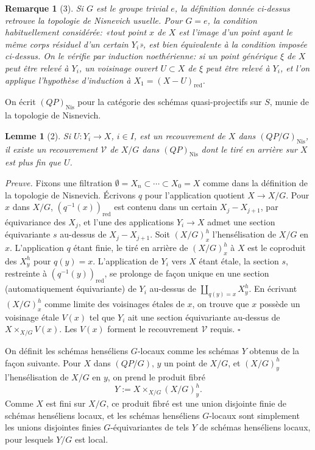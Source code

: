 \documentclass[11pt]{article}
\newcommand{\Nis}{\mathrm{Nis}}
\newcommand{\red}{\mathrm{red}}
\theoremstyle{deligne}
\newtheorem*{lemma*}{Lemme}
\newtheorem*{remark*}{Remarque}
\newenvironment{proofdel}{\noindent\textit{Preuve.}}{\hfill$\square$}
\begin{document}
\begin{remark*}[3]
Si \(G\) est le groupe trivial \(e\), la définition donnée ci-dessus retrouve la topologie de Nisnevich usuelle. Pour \(G=e\), la condition habituellement considérée: «tout point \(x\) de \(X\) est l'image d'un point ayant le même corps résiduel d'un certain \(Y_i\)», est bien équivalente à la condition imposée ci-dessus. On le vérifie par induction noethérienne: si un point générique \(\xi\) de \(X\) peut être relevé à \(Y_i\), un voisinage ouvert \(U\subset X\) de \(\xi\) peut être relevé à \(Y_i\), et l'on applique l'hypothèse d'induction à \(X_1=(X-U)_{\red}\).
\end{remark*}

On écrit \((QP)_{\Nis}\) pour la catégorie des schémas quasi-projectifs sur \(S\), munie de la topologie de Nisnevich.

\begin{lemma*}[2]
Si \(U:Y_i\to X\), \(i\in I\), est un recouvrement de \(X\) dans \((QP/G)_{\Nis}\), il existe un recouvrement \(\mathcal V\) de \(X/G\) dans \((QP)_{\Nis}\) dont le tiré en arrière sur \(X\) est plus fin que \(U\).
\end{lemma*}

\begin{proofdel}
Fixons une filtration \(\emptyset=X_n\subset\cdots\subset X_0=X\) comme dans la définition de la topologie de Nisnevich. Écrivons \(q\) pour l'application quotient \(X\to X/G\). Pour \(x\) dans \(X/G\), \((q^{-1}(x))_{\red}\) est contenu dans un certain \(X_j-X_{j+1}\), par équivariance des \(X_j\), et l'une des applications \(Y_i\to X\) admet une section équivariante \(s\) au-dessus de \(X_j-X_{j+1}\). Soit \((X/G)^h_x\) l'hensélisation de \(X/G\) en \(x\). L'application \(q\) étant finie, le tiré en arrière de \((X/G)^h_x\) à \(X\) est le coproduit des \(X^h_y\) pour \(q(y)=x\). L'application de \(Y_i\) vers \(X\) étant étale, la section \(s\), restreinte à \((q^{-1}(y))_{\red}\), se prolonge de façon unique en une section (automatiquement équivariante) de \(Y_i\) au-dessus de \(\coprod_{q(y)=x}X^h_y\). En écrivant \((X/G)^h_x\) comme limite des voisinages étales de \(x\), on trouve que \(x\) possède un voisinage étale \(V(x)\) tel que \(Y_i\) ait une section équivariante au-dessus de \(X\times_{X/G}V(x)\). Les \(V(x)\) forment le recouvrement \(\mathcal V\) requis.
\end{proofdel}

On définit les schémas henséliens \(G\)-locaux comme les schémas \(Y\) obtenus de la façon suivante. Pour \(X\) dans \((QP/G)\), \(y\) un point de \(X/G\), et \((X/G)^h_y\) l'hensélisation de \(X/G\) en \(y\), on prend le produit fibré
\[
Y:=X\times_{X/G}(X/G)^h_y.
\]
Comme \(X\) est fini sur \(X/G\), ce produit fibré est une union disjointe finie de schémas henséliens locaux, et les schémas henséliens \(G\)-locaux sont simplement les unions disjointes finies \(G\)-équivariantes de tels \(Y\) de schémas henséliens locaux, pour lesquels \(Y/G\) est local.
\end{document}
